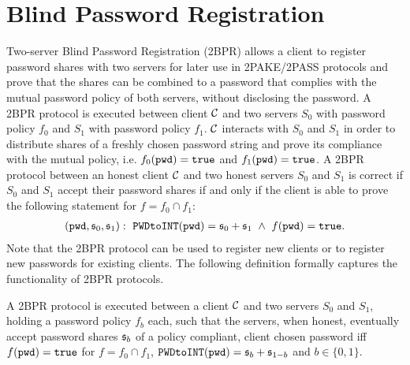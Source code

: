 \section{Blind Password Registration} \label{sec:2pake-registration}
Two-server Blind Password Registration (2BPR) allows a client to register password shares with two servers for later use in 2PAKE/2PASS protocols and prove that the shares can be combined to a password that complies with the mutual password policy of both servers, without disclosing the password.
A 2BPR protocol is executed between client $\mathcal{C}$ and two servers $S_0$ with password policy $f_0$ and $S_1$ with password policy $f_1$.
$\mathcal{C}$ interacts with $S_0$ and $S_1$ in order to distribute shares of a freshly chosen password string \pwd and prove its compliance with the mutual policy, i.e. $f_0(\mathtt{pwd})=\mathtt{true}$ and $f_1(\mathtt{pwd})=\mathtt{true}$.
A 2BPR protocol between an honest client $\mathcal{C}$ and two honest servers $S_0$ and $S_1$ is correct if $S_0$ and $S_1$ accept their password shares if and only if the client is able to prove the following statement for $f=f_0\cap f_1$:
\begin{align}
  (\mathtt{pwd},\mathfrak{s}_0,\mathfrak{s}_1):~ \texttt{PWDtoINT}(\mathtt{pwd})=\mathfrak{s}_0+\mathfrak{s}_1 ~ \wedge ~ f(\mathtt{pwd})=\mathtt{true}.
  \label{eq:zkppc-pok}
\end{align}
Note that the 2BPR protocol can be used to register new clients or to register new passwords for existing clients. The following definition formally captures the functionality of 2BPR protocols.

\begin{definition}\label{def:2bpr}
A 2BPR protocol is executed between a client $\mathcal{C}$ and two servers $S_0$ and $S_{1}$, holding a password policy $f_b$ each, such that the servers, when honest, eventually accept password shares $\mathfrak{s}_b$ of a policy compliant, client chosen password \pwd iff $f(\mathtt{pwd})=\mathtt{true}$ for $f=f_0\cap f_1$, $\texttt{PWDtoINT}(\mathtt{pwd})=\mathfrak{s}_b+\mathfrak{s}_{1-b}$ and $b\in\{0,1\}$.
\eod
\end{definition}

